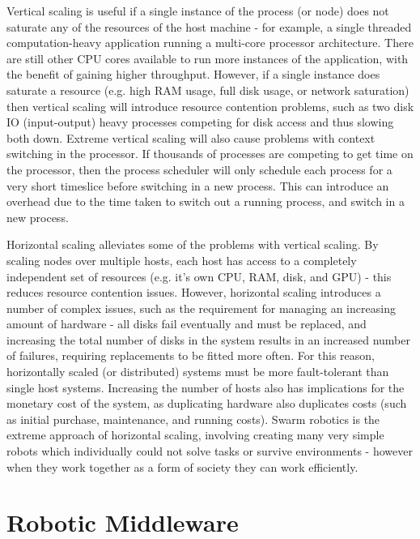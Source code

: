 \documentclass[../dissertation.tex]{subfiles}
\begin{document}
Vertical scaling is useful if a single instance of the process (or node) does not saturate any of the resources of the host machine - for example, a single threaded computation-heavy application running a multi-core processor architecture. There are still other CPU cores available to run more instances of the application, with the benefit of gaining higher throughput. However, if a single instance does saturate a resource (e.g. high RAM usage, full disk usage, or network saturation) then vertical scaling will introduce resource contention problems, such as two disk IO (input-output) heavy processes competing for disk access and thus slowing both down. Extreme vertical scaling will also cause problems with context switching in the processor. If thousands of processes are competing to get time on the processor, then the process scheduler will only schedule each process for a very short timeslice before switching in a new process. This can introduce an overhead due to the time taken to switch out a running process, and switch in a new process.

Horizontal scaling alleviates some of the problems with vertical scaling. By scaling nodes over multiple hosts, each host has access to a completely independent set of resources (e.g. it's own CPU, RAM, disk, and GPU) - this reduces resource contention issues. However, horizontal scaling introduces a number of complex issues, such as the requirement for managing an increasing amount of hardware - all disks fail eventually and must be replaced, and increasing the total number of disks in the system results in an increased number of failures, requiring replacements to be fitted more often. For this reason, horizontally scaled (or distributed) systems must be more fault-tolerant than single host systems. Increasing the number of hosts also has implications for the monetary cost of the system, as duplicating hardware also duplicates costs (such as initial purchase, maintenance, and running costs). Swarm robotics is the extreme approach of horizontal scaling, involving creating many very simple robots which individually could not solve tasks or survive environments - however when they work together as a form of society they can work efficiently\cite{csahin2004swarm}.

\section{Robotic Middleware}
\label{robotic-middleware}
\end{document}
